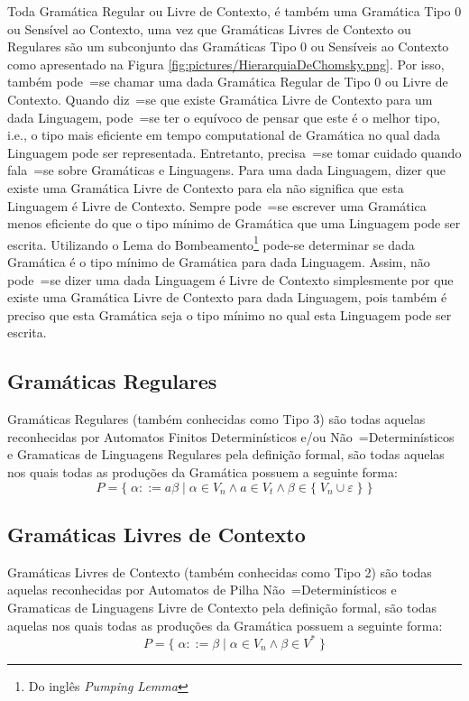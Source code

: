 {    Toda Gramática Regular ou Livre de Contexto,
    é também uma Gramática Tipo 0 ou Sensível ao Contexto,
    uma vez que Gramáticas Livres de Contexto ou Regulares são um
    subconjunto das Gramáticas Tipo 0 ou Sensíveis ao Contexto como
    apresentado na Figura \ref{fig:pictures/HierarquiaDeChomsky.png}.
    Por isso,
    também pode~=se chamar uma dada Gramática Regular de Tipo 0 ou Livre de Contexto.
    Quando diz~=se que existe Gramática Livre de Contexto para um dada Linguagem,
    pode~=se ter o equívoco de pensar que este é o melhor tipo,
    i.e.,
    o tipo mais eficiente em tempo computational de Gramática
    no qual dada Linguagem pode ser representada.
    Entretanto,
    precisa~=se tomar cuidado quando fala~=se sobre Gramáticas e
    Linguagens.
    Para uma dada Linguagem,
    dizer que existe uma Gramática Livre de Contexto para ela
    não significa que esta Linguagem é Livre de Contexto.
    Sempre pode~=se escrever uma Gramática menos eficiente do que o
    tipo mínimo de Gramática que uma Linguagem pode ser escrita.
    Utilizando o Lema do Bombeamento\footnote{Do inglês \textit{Pumping Lemma}} \cite{hopcroftBook}
    pode-se determinar se dada Gramática é o tipo mínimo de Gramática para dada Linguagem.
    Assim,
    não pode~=se dizer uma dada Linguagem é Livre de Contexto simplesmente
    por que existe uma Gramática Livre de Contexto para dada Linguagem,
    pois também é preciso que esta Gramática seja o tipo
    mínimo no qual esta Linguagem pode ser escrita.


\subsection*{Gramáticas Regulares}

    Gramáticas Regulares (também conhecidas como Tipo 3) são todas aquelas reconhecidas
    por Automatos Finitos Determinísticos e/ou Não~=Determinísticos e
    Gramaticas de Linguagens Regulares pela definição formal,
    são todas aquelas nos quais todas as produções da Gramática possuem a seguinte forma:
    $$ P = \{\; \alpha ::= a \beta \;|\; \alpha \in V_n \land a \in V_t
                \land \beta \in \{\; V_n \cup \varepsilon\; \} \;\} $$

\subsection*{Gramáticas Livres de Contexto}

    Gramáticas Livres de Contexto (também conhecidas como Tipo 2) são todas
    aquelas reconhecidas por Automatos de Pilha Não~=Determinísticos e
    Gramaticas de Linguagens Livre de Contexto pela definição formal,
    são todas aquelas nos quais todas as produções da Gramática possuem a seguinte forma:
    $$ P = \{\; \alpha ::= \beta \;|\; \alpha \in V_n \land \beta \in V^* \;\} $$


}
